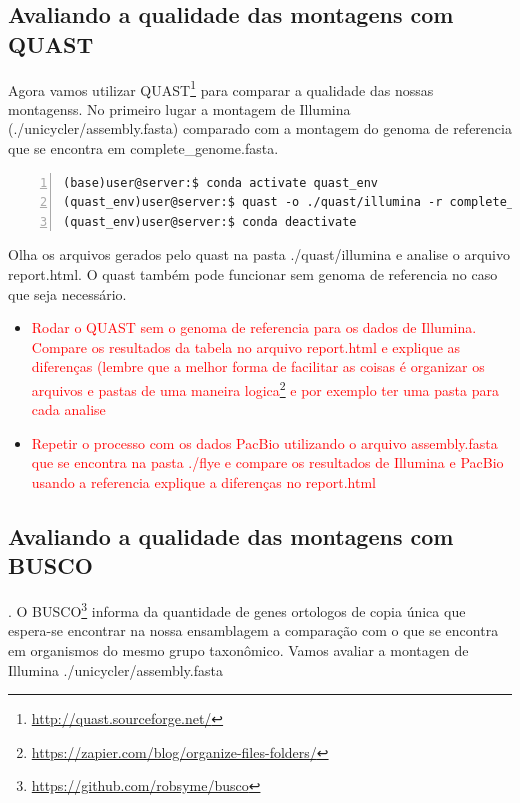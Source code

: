 \documentclass[letter,11pt]{book}
\begin{document}
\subsection{Avaliando a qualidade das montagens com QUAST}
Agora vamos utilizar QUAST\footnote{\url{http://quast.sourceforge.net/}} para comparar a qualidade das nossas montagenss. No primeiro lugar a montagem de Illumina (./unicycler/assembly.fasta) comparado com a montagem do genoma de referencia que se encontra em complete\_genome.fasta.

\begin{Verbatim}[commandchars=!\{\}, numbers=left,label= QUAST,frame=topline,fontsize=\scriptsize]
(base)user@server:$ conda activate quast_env
(quast_env)user@server:$ quast -o ./quast/illumina -r complete_genome.fasta ./unicycler/assembly.fasta
(quast_env)user@server:$ conda deactivate
\end{Verbatim}

Olha os arquivos gerados pelo quast na pasta ./quast/illumina e analise o arquivo report.html.
O quast também pode funcionar sem genoma de referencia no caso que seja necessário.

\begin{itemize}
\item \textcolor{red}{Rodar o QUAST sem o genoma de referencia para os dados de Illumina. Compare os resultados da tabela no arquivo report.html e explique as diferenças} \textcolor{red} {(lembre que a melhor forma de  facilitar as coisas é organizar os arquivos e pastas de uma maneira logica\footnote{\url{https://zapier.com/blog/organize-files-folders/}}  e por exemplo ter uma pasta para cada analise}
\item \textcolor{red}{Repetir o processo com os dados PacBio utilizando o arquivo assembly.fasta que se encontra na pasta ./flye e compare os resultados de Illumina e PacBio usando a referencia explique a diferenças no report.html}
\end{itemize}

\subsection{Avaliando a qualidade das montagens com BUSCO}.
O BUSCO\footnote{\url{https://github.com/robsyme/busco}} informa da quantidade de genes ortologos de copia única que espera-se encontrar na nossa ensamblagem a comparação com o que se encontra em organismos do mesmo grupo taxonômico.
Vamos avaliar a montagen de Illumina ./unicycler/assembly.fasta
\end{document}
